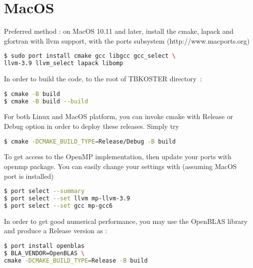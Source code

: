 \documentclass[12pt, onecolumn]{memoir}
\begin{document}
\section{MacOS}
Preferred method : on MacOS 10.11 and later, install the cmake, lapack and gfortran with llvm support, with the ports subsystem (http://www.macports.org)
\begin{lstlisting}[language=sh,basicstyle=\small]
$ sudo port install cmake gcc libgcc gcc_select \
llvm-3.9 llvm_select lapack libomp
\end{lstlisting}
In order to build the code, to the root of TBKOSTER directory~:
\begin{lstlisting}[language=sh,basicstyle=\small]
$ cmake -B build
$ cmake -B build --build
\end{lstlisting}
For both Linux and MacOS platform, you can invoke cmake with Release or Debug option in order to deploy these releases. Simply try
\begin{lstlisting}[language=sh,basicstyle=\small]
$ cmake -DCMAKE_BUILD_TYPE=Release/Debug -B build
\end{lstlisting}
To get access to the OpenMP implementation, then update your ports with openmp package. You can easily change your settings with (assuming MacOS port is installed)
\begin{lstlisting}[language=sh,basicstyle=\small]
$ port select --summary
$ port select --set llvm mp-llvm-3.9
$ port select --set gcc mp-gcc6
\end{lstlisting}
In order to get good numerical performance, you may use the OpenBLAS library and produce a Release version as :
\begin{lstlisting}[language=sh,basicstyle=\small]
$ port install openblas
$ BLA_VENDOR=OpenBLAS \
cmake -DCMAKE_BUILD_TYPE=Release -B build
\end{lstlisting}
\end{document}
